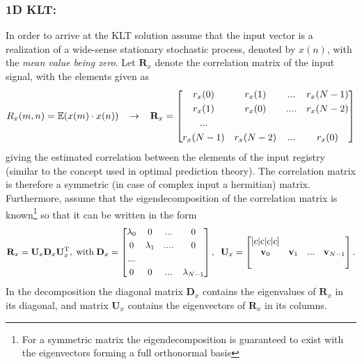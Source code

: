 \subsubsection{1D KLT:}
In order to arrive at the KLT solution assume that the input vector is a realization of a wide-sense stationary stochastic process, denoted by $x(n)$, with the \emph{mean value being zero}.
Let $\mathbf{R}_x$ denote the correlation matrix of the input signal, with the elements given as
\begin{equation}
R_x(m,n) = \operatorname{\mathbb{E}}( x(m) \cdot x(n) )
\hspace{3mm} \rightarrow \hspace{3mm}
\mathbf{R}_x = 
  \begin{bmatrix}
       r_x(0) & r_x(1) & ... & r_x(N-1) \\[0.3em]
       r_x(1) & r_x(0) & .... & r_x(N-2)\\[0.3em]
       ... \\[0.3em]
       r_x(N-1) & r_x(N-2) & ... & r_x(0)\end{bmatrix}
\end{equation}
giving the estimated correlation between the elements of the input registry (similar to the concept used in optimal prediction theory).
The correlation matrix is therefore a symmetric (in case of complex input a hermitian) matrix.
Furthermore, assume that the eigendecomposition of the correlation matrix is known\footnote{For a symmetric matrix the eigendecomposition is guaranteed to exist with the eigenvectors forming a full orthonormal basis} so that it can be written in the form
\begin{equation}
\mathbf{R}_x  = \mathbf{U}_x  \mathbf{D}_x  \mathbf{U}_x ^{\mathrm{T}}, \hspace{1mm} \text{with} \hspace{1mm}
\mathbf{D}_x  =   
\begin{bmatrix}
       \lambda_0 & 0 & ... & 0 \\[0.3em]
       0 & \lambda_1 & .... & 0\\[0.3em]
       ... \\[0.3em]
       0 & 0 & ... & \lambda_{N-1}\end{bmatrix},
       \hspace{2mm}
\mathbf{U}_x  =       \begin{bmatrix}[c|c|c|c]
      &   &  & \\
   \mathbf{v}_0 & \mathbf{v}_1 & ... & \mathbf{v}_{N-1} \\
     &   &   & \\
\end{bmatrix}.
\end{equation}
In the decomposition the diagonal matrix $\mathbf{D}_x $ contains the eigenvalues of $\mathbf{R}_x$ in its diagonal, and matrix $\mathbf{U}_x $ contains the eigenvectors of $\mathbf{R}_x$ in its columns.

